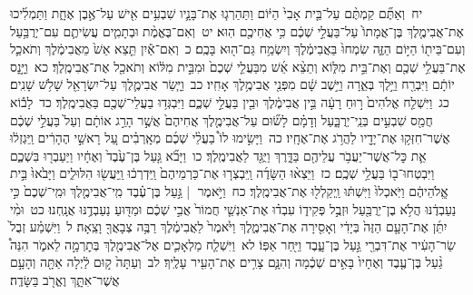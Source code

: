 \documentclass[18pt]{article}
\begin{document}
 {\loc יח~}וְאַתֶּ֞ם קַמְתֶּ֨ם עַל־בֵּ֤ית אָבִי֙ הַיּ֔וֹם וַתַּהַרְג֧וּ אֶת־בָּנָ֛יו שִׁבְעִ֥ים אִ֖ישׁ עַל־אֶ֣בֶן אֶחָ֑ת וַתַּמְלִ֜יכוּ אֶת־אֲבִימֶ֤לֶךְ בֶּן־אֲמָתוֹ֙ עַל־בַּעֲלֵ֣י שְׁכֶ֔ם כִּ֥י אֲחִיכֶ֖ם הֽוּא׃ \startlock
 {\loc יט~}וְאִם־בֶּאֱמֶ֨ת וּבְתָמִ֧ים עֲשִׂיתֶ֛ם עִם־יְרֻבַּ֥עַל וְעִם־בֵּית֖וֹ הַיּ֣וֹם הַזֶּ֑ה שִׂמְחוּ֙ בַּאֲבִימֶ֔לֶךְ וְיִשְׂמַ֥ח גַּם־ה֖וּא בָּכֶֽם׃ \startlock
 {\loc כ~}וְאִם־אַ֕יִן תֵּ֤צֵא אֵשׁ֙ מֵאֲבִימֶ֔לֶךְ וְתֹאכַ֛ל אֶת־בַּעֲלֵ֥י שְׁכֶ֖ם וְאֶת־בֵּ֣ית מִלּ֑וֹא וְתֵצֵ֨א אֵ֜שׁ מִבַּעֲלֵ֤י שְׁכֶם֙ וּמִבֵּ֣ית מִלּ֔וֹא וְתֹאכַ֖ל אֶת־אֲבִימֶֽלֶךְ׃ \startlock
 {\loc כא~}וַיָּ֣נׇס יוֹתָ֔ם וַיִּבְרַ֖ח וַיֵּ֣לֶךְ בְּאֵ֑רָה וַיֵּ֣שֶׁב שָׁ֔ם מִפְּנֵ֖י אֲבִימֶ֥לֶךְ אָחִֽיו׃ \startlock
 {\loc כב~}וַיָּ֧שַׂר אֲבִימֶ֛לֶךְ עַל־יִשְׂרָאֵ֖ל שָׁלֹ֥שׁ שָׁנִֽים׃ \startlock
 {\loc כג~}וַיִּשְׁלַ֤ח אֱלֹהִים֙ ר֣וּחַ רָעָ֔ה בֵּ֣ין אֲבִימֶ֔לֶךְ וּבֵ֖ין בַּעֲלֵ֣י שְׁכֶ֑ם וַיִּבְגְּד֥וּ בַעֲלֵי־שְׁכֶ֖ם בַּאֲבִימֶֽלֶךְ׃ \startlock
 {\loc כד~}לָב֕וֹא חֲמַ֖ס שִׁבְעִ֣ים בְּנֵֽי־יְרֻבָּ֑עַל וְדָמָ֗ם לָשׂ֞וּם עַל־אֲבִימֶ֤לֶךְ אֲחִיהֶם֙ אֲשֶׁ֣ר הָרַ֣ג אוֹתָ֔ם וְעַל֙ בַּעֲלֵ֣י שְׁכֶ֔ם אֲשֶׁר־חִזְּק֥וּ אֶת־יָדָ֖יו לַהֲרֹ֥ג אֶת־אֶחָֽיו׃ \startlock
 {\loc כה~}וַיָּשִׂ֣ימוּ לוֹ֩ בַעֲלֵ֨י שְׁכֶ֜ם מְאָֽרְבִ֗ים עַ֚ל רָאשֵׁ֣י הֶהָרִ֔ים וַֽיִּגְזְל֔וּ אֵ֛ת כׇּל־אֲשֶׁר־יַעֲבֹ֥ר עֲלֵיהֶ֖ם בַּדָּ֑רֶךְ וַיֻּגַּ֖ד לַאֲבִימֶֽלֶךְ׃ \startlock
 {\loc כו~}וַיָּבֹ֞א גַּ֤עַל בֶּן־עֶ֙בֶד֙ וְאֶחָ֔יו וַיַּעַבְר֖וּ בִּשְׁכֶ֑ם וַיִּבְטְחוּ־ב֖וֹ בַּעֲלֵ֥י שְׁכֶֽם׃ \startlock
 {\loc כז~}וַיֵּצְא֨וּ הַשָּׂדֶ֜ה וַֽיִּבְצְר֤וּ אֶת־כַּרְמֵיהֶם֙ וַֽיִּדְרְכ֔וּ וַֽיַּעֲשׂ֖וּ הִלּוּלִ֑ים וַיָּבֹ֙אוּ֙ בֵּ֣ית אֱֽלֹהֵיהֶ֔ם וַיֹּֽאכְלוּ֙ וַיִּשְׁתּ֔וּ וַֽיְקַלְל֖וּ אֶת־אֲבִימֶֽלֶךְ׃ \startlock
 {\loc כח~}וַיֹּ֣אמֶר  |  גַּ֣עַל בֶּן־עֶ֗בֶד מִֽי־אֲבִימֶ֤לֶךְ וּמִֽי־שְׁכֶם֙ כִּ֣י נַעַבְדֶ֔נּוּ הֲלֹ֥א בֶן־יְרֻבַּ֖עַל וּזְבֻ֣ל פְּקִיד֑וֹ עִבְד֗וּ אֶת־אַנְשֵׁ֤י חֲמוֹר֙ אֲבִ֣י שְׁכֶ֔ם וּמַדּ֖וּעַ נַעַבְדֶ֥נּוּ אֲנָֽחְנוּ׃ \startlock
 {\loc כט~}וּמִ֨י יִתֵּ֜ן אֶת־הָעָ֤ם הַזֶּה֙ בְּיָדִ֔י וְאָסִ֖ירָה אֶת־אֲבִימֶ֑לֶךְ וַיֹּ֙אמֶר֙ לַאֲבִימֶ֔לֶךְ רַבֶּ֥ה צְבָאֲךָ֖ וָצֵֽאָה׃ \startlock
 {\loc ל~}וַיִּשְׁמַ֗ע זְבֻל֙ שַׂר־הָעִ֔יר אֶת־דִּבְרֵ֖י גַּ֣עַל בֶּן־עָ֑בֶד וַיִּ֖חַר אַפּֽוֹ׃ \startlock
 {\loc לא~}וַיִּשְׁלַ֧ח מַלְאָכִ֛ים אֶל־אֲבִימֶ֖לֶךְ בְּתׇרְמָ֣ה לֵאמֹ֑ר הִנֵּה֩ גַ֨עַל בֶּן־עֶ֤בֶד וְאֶחָיו֙ בָּאִ֣ים שְׁכֶ֔מָה וְהִנָּ֛ם צָרִ֥ים אֶת־הָעִ֖יר עָלֶֽיךָ׃ \startlock
 {\loc לב~}וְעַתָּה֙ ק֣וּם לַ֔יְלָה אַתָּ֖ה וְהָעָ֣ם אֲשֶׁר־אִתָּ֑ךְ וֶאֱרֹ֖ב בַּשָּׂדֶֽה׃ \startlock
\end{document}
